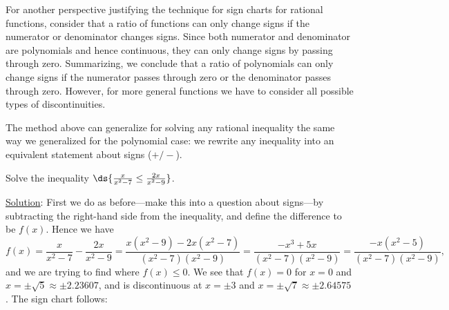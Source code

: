 For another perspective justifying the technique for sign
charts for rational functions, consider that a ratio of functions
can only change signs if the numerator or denominator
changes signs.  Since both numerator and denominator
are polynomials and hence continuous,
they can only change signs by passing through zero.
Summarizing, we conclude that a ratio of polynomials 
can only change signs if the
numerator passes through zero or the denominator passes through
zero.  However, for more general functions we have to consider
all possible types of discontinuities.

The method above can generalize for solving any rational inequality
the same way we generalized for the polynomial case:
we rewrite any inequality into an equivalent statement
about signs ($+/-$).

\bex Solve the inequality $\ds{\frac{x}{x^2-7}\le\frac{2x}{x^2-9}}$.

\underline{Solution}: First we do as before---make this into a question
about signs---by subtracting the right-hand side from the inequality,
and define the difference to be $f(x)$.  Hence we have
$$f(x)=\frac{x}{x^2-7}-\frac{2x}{x^2-9}
=\frac{x(x^2-9)-2x(x^2-7)}{(x^2-7)(x^2-9)}
=\frac{-x^3+5x}{(x^2-7)(x^2-9)}=\frac{-x(x^2-5)}{(x^2-7)(x^2-9)},$$
and we are trying to find where $f(x)\le0$.
We see that $f(x)=0$ for $x=0$ and $x=\pm\sqrt5\approx\pm2.23607$, 
and is discontinuous at $x=\pm3$ and $x=\pm\sqrt7\approx\pm2.64575$.  
The sign chart follows:

